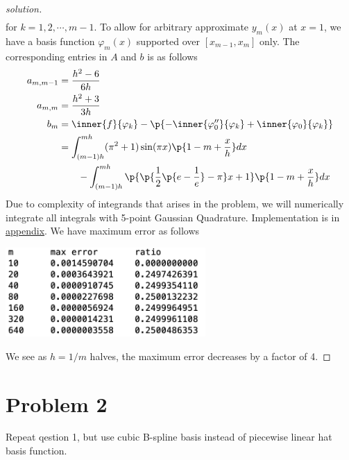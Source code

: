 \documentclass[11pt]{article}
\begin{document}
\begin{proof}[solution]
\begin{align*}
    \end{align*}
    for $k=1,2,\cdots, m-1$. To allow for arbitrary approximate $y_m(x)$ at $x=1$, we have a basis function $\varphi_m(x)$ supported over $[x_{m-1}, x_m]$ only. The corresponding entries in $A$ and $b$ is as follows
    \begin{align*}
        a_{m, m-1} &= \frac{h^2-6}{6h} \\
        a_{m,m} &= \frac{h^2+3}{3h} \\
        b_m 
        &= \inner{f}{\varphi_k} - \p{
            -\inner{\varphi_0''}{\varphi_k} + \inner{\varphi_0}{\varphi_k}
        }  \\
        &=\int_{(m-1)h}^{mh} (\pi^2 + 1) \sin(\pi x) \p{ 1-m+\frac{x}{h} } dx\\
        &\quad \quad 
        -\int_{(m-1)h}^{mh}\p{\p{\frac{1}{2} \p{e - \frac{1}{e}} - \pi}x + 1} \p{ 1-m+\frac{x}{h}} dx
    \end{align*}
    Due to complexity of integrands that arises in the problem, we will numerically integrate all integrals with 5-point Gaussian Quadrature. Implementation is in \hyperref[q1code]{appendix}. We have maximum error as follows
    \begin{center}
        \includegraphics[width=3in]{q1_out}
    \end{center} 
    We see as $h=1/m$ halves, the maximum error decreases by a factor of 4.
\end{proof}


\section*{Problem 2} Repeat qestion 1, but use cubic B-spline basis instead of piecewise linear hat basis function. 
\end{document}
